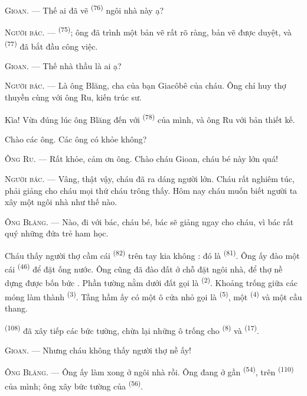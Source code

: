 \textsc{Gioan}. --- Thế ai đã vẽ  \textsuperscript{(76)} ngôi nhà
này ạ?

\textsc{Người bác}. ---  \textsuperscript{(75)}; ông đã trình
một bản vẽ rất rõ ràng, bản vẽ được duyệt, và 
\textsuperscript{(77)} đã bắt đầu công việc.

\textsc{Gioan}. --- Thế nhà thầu là ai ạ?

\textsc{Người bác}. --- Là ông Blăng, cha của bạn Giacôbê của cháu. Ông chỉ huy thợ
thuyền cùng với ông Ru, kiến trúc sư.

Kìa! Vừa đúng lúc ông Blăng đến với  \textsuperscript{(78)} của mình,
và ông Ru với bản thiết kế.

Chào các ông. Các ông có khỏe không?

\textsc{Ông Ru}. --- Rất khỏe, cảm ơn ông. Chào cháu Gioan, cháu bé này lớn quá!

\textsc{Người bác}. --- Vâng, thật vậy, cháu đã ra dáng người lớn. Cháu rất nghiêm túc,
phải giảng cho cháu mọi thứ cháu trông thấy. Hôm nay cháu muốn biết người ta xây một
ngôi nhà như thế nào.

\VUsaut{3.0mm}

\textsc{Ông Blăng}. --- Nào, đi với bác, cháu bé, bác sẽ giảng ngay cho cháu, vì bác rất
quý những đứa trẻ ham học.

Cháu thấy người thợ cầm cái  \textsuperscript{(82)} trên tay kia không :
đó là  \textsuperscript{(81)}. Ông ấy đào một cái 
\textsuperscript{(46)} để đặt ống nước. Ông cũng đã đào đất ở chỗ đặt ngôi nhà, để thợ
nề dựng được bốn bức . Phần tường nằm dưới đất gọi là 
\textsuperscript{(2)}. Khoảng trống giữa các móng làm thành 
\textsuperscript{(3)}. Tầng hầm ấy có một ô cửa nhỏ gọi là 
\textsuperscript{(5)}, một  \textsuperscript{(4)} và một cầu thang.

 \textsuperscript{(108)} đã xây tiếp các bức tường, chừa lại những ô
trống cho  \textsuperscript{(8)} và 
\textsuperscript{(17)}.

\textsc{Gioan}. --- Nhưng cháu không thấy người thợ nề ấy!

\textsc{Ông Blăng}. --- Ông ấy làm xong ở ngôi nhà rồi. Ông đang ở gần  \textsuperscript{(54)}, trên  \textsuperscript{(110)} của mình;
ông xây bức tường của  \textsuperscript{(56)}.

